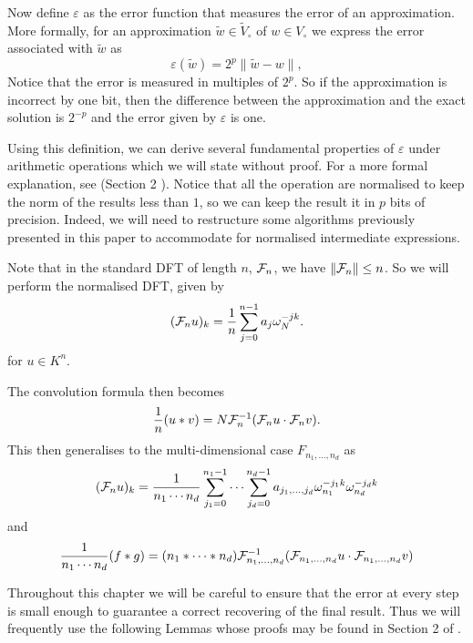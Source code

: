Now define $\varepsilon$ as the error function that measures the error of an approximation. More formally, for an approximation $\tilde{w} \in \tilde{V}_\circ$ of $w \in V_\circ$ we express the error associated with $\tilde{w}$ as
\[
    \varepsilon(\tilde{w}) = 2^p \|\tilde{w} - w\|,
\]
Notice that the error is measured in multiples of $2^p$. So if the approximation is incorrect by one bit, then the difference between the approximation and the exact solution is $2^{-p}$ and the error given by $\varepsilon$ is one.

Using this definition, we can derive several fundamental properties of $\varepsilon$ under arithmetic operations which we will state without proof. For a more formal explanation, see (Section 2 \cite{nlogn}). Notice that all the operation are normalised to keep the norm of the results less than $1$, so we can keep the result it in $p$ bits of precision. Indeed, we will need to restructure some algorithms previously presented in this paper to accommodate for normalised intermediate expressions.

Note that in the standard DFT of length $n$, $\mathcal F_n$, we have $\|\mathcal F_n\| \le n$. So we will perform the normalised DFT, given by
\[
    (\mathcal F_n u)_k = \frac{1}{n} \sum^{n-1}_{j=0} a_j \omega_N^{-jk}.
\]
for $u \in K^n$.

The convolution formula then becomes
\[
    \frac{1}{n} (u \ast v) = N\mathcal F_n^{-1} (\mathcal F_n u \cdot \mathcal F_n v).
\]
This then generalises to the multi-dimensional case $F_{n_1, \ldots, n_d}$ as
\[
    (\mathcal F_n u)_k = \frac{1}{n_1\cdots n_d} \sum^{n_1-1}_{j_1=0} \cdots \sum^{n_d-1}_{j_d=0} a_{j_1, \ldots, j_d} \omega_{n_1}^{-j_1 k} \omega_{n_d}^{-j_d k}
\]
and
\begin{equation}\label{eq:normalised-convolution}
    \frac{1}{n_1 \cdots n_d} (f \ast g) = (n_1 \ast \cdots \ast n_d)\mathcal F_{n_1, \ldots, n_d}^{-1} (\mathcal F_{n_1, \ldots, n_d} u \cdot \mathcal F_{n_1, \ldots, n_d} v)
\end{equation}

\medskip

Throughout this chapter we will be careful to ensure that the error at every step is small enough to guarantee a correct recovering of the final result. Thus we will frequently use the following Lemmas whose proofs may be found in Section 2 of \cite{nlogn}. 

